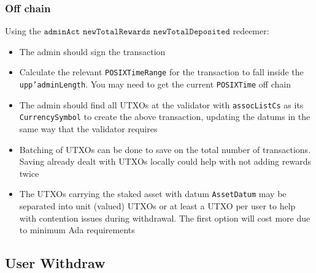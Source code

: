 \documentclass[10pt, a4paper]{article}
\theoremstyle{definition}
\begin{document}
\subsubsection{Off chain}
Using the $\texttt{adminAct newTotalRewards newTotalDeposited}$ redeemer:
\begin{itemize}
\item{The admin should sign the transaction}
\item{Calculate the relevant \texttt{POSIXTimeRange} for the transaction to fall inside the \texttt{upp'adminLength}. You may need to get the current \texttt{POSIXTime} off chain}
\item{The admin should find all UTXOs at the validator with \texttt{assocListCs} as its \texttt{CurrencySymbol} to create the above transaction, updating the datums in the same way that the validator requires}
\item{Batching of UTXOs can be done to save on the total number of transactions. Saving already dealt with UTXOs locally could help with not adding rewards twice}
\item{The UTXOs carrying the staked asset with datum \texttt{AssetDatum} may be separated into unit (valued) UTXOs or at least a UTXO per user to help with contention issues during withdrawal. The first option will cost more due to minimum Ada requirements}
\end{itemize}

\subsection{User Withdraw}\label{subsection:UserWithdraw}
\end{document}

